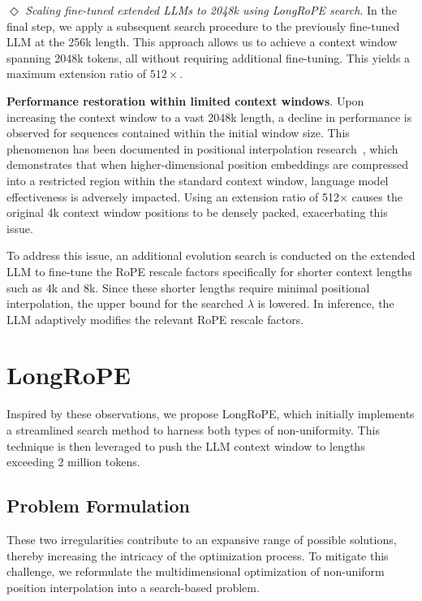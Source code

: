 $\Diamond$ \textit{Scaling fine-tuned extended LLMs to 2048k using LongRoPE search}. In the final step, we apply a subsequent search procedure to the previously fine-tuned LLM at the 256k length. This approach allows us to achieve a context window spanning 2048k tokens, all without requiring additional fine-tuning. This yields a maximum extension ratio of $512\times$.

\textbf{Performance restoration within limited context windows}. Upon increasing the context window to a vast 2048k length, a decline in performance is observed for sequences contained within the initial window size. This phenomenon has been documented in positional interpolation research~\cite{pi}, which demonstrates that when higher-dimensional position embeddings are compressed into a restricted region within the standard context window, language model effectiveness is adversely impacted. Using an extension ratio of 512$\times$ causes the original 4k context window positions to be densely packed, exacerbating this issue.

To address this issue, an additional evolution search is conducted on the extended LLM to fine-tune the RoPE rescale factors specifically for shorter context lengths such as 4k and 8k. Since these shorter lengths require minimal positional interpolation, the upper bound for the searched $\lambda$ is lowered. In inference, the LLM adaptively modifies the relevant RoPE rescale factors.

\section{LongRoPE}

\label{sec:method}
Inspired by these observations, we propose LongRoPE, which initially implements a streamlined search method to harness both types of non-uniformity. This technique is then leveraged to push the LLM context window to lengths exceeding 2 million tokens.

\subsection{Problem Formulation}

These two irregularities contribute to an expansive range of possible solutions, thereby increasing the intricacy of the optimization process. To mitigate this challenge, we reformulate the multidimensional optimization of non-uniform position interpolation into a search-based problem.

